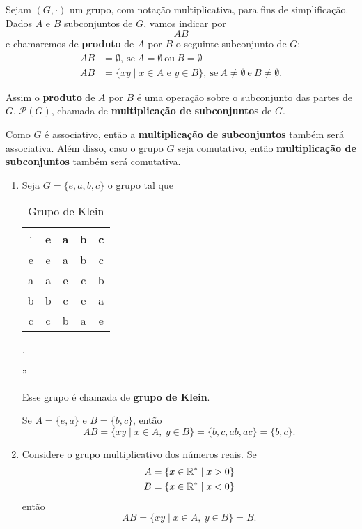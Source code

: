 Sejam $(G, \cdot)$ um grupo, com notação multiplicativa, para fins de simplificação. Dados $A$ e $B$ subconjuntos de $G$, vamos indicar por
\[
    AB
\]
e chamaremos de \textbf{produto} de $A$ por $B$ o seguinte subconjunto de $G$:
\begin{align*}
    AB &= \emptyset,\ \mbox{se}\ A = \emptyset\ \mbox{ou}\ B = \emptyset\\
    AB &= \{xy \mid x \in A \mbox{ e } y \in B\},\ \mbox{se}\ A \ne \emptyset\ \mbox{e}\ B \ne \emptyset.
\end{align*}

Assim o \textbf{produto} de $A$ por $B$ é uma operação sobre o subconjunto das partes de $G$, $\mathcal{P}(G)$, chamada de \textbf{multiplicação de subconjuntos} de $G$.

Como $G$ é associativo, então a \textbf{multiplicação de subconjuntos} também será associativa. Além disso, caso o grupo $G$ seja comutativo, então \textbf{multiplicação de subconjuntos} também será comutativa.

\begin{exemplos}
    \begin{enumerate}[label={\arabic*})]
        \item Seja $G = \{e, a, b, c\}$ o grupo tal que
        \begin{center}
            \begin{table}[htp]
                \centering
                \caption{Grupo de Klein}
                \begin{tabular}{|c|c|c|c|c|}
                    \hline
                    $\cdot$ & e & a & b & c\\
                    \hline
                    e & e & a & b & c\\
                    \hline
                    a & a & e & c & b\\
                    \hline
                    b & b & c & e & a\\
                    \hline
                    c & c & b & a & e\\
                    \hline
                \end{tabular}.
            \end{table}    ''
        \end{center}

        Esse grupo é chamada de \textbf{grupo de Klein}.

        Se $A = \{e, a\}$ e $B = \{b, c\}$, então
        \[
            AB = \{xy \mid x \in A,\ y \in B\} = \{b, c, ab, ac\} = \{b, c\}.
        \]

        \item Considere o grupo multiplicativo dos números reais. Se
        \begin{align*}
            A &= \{x \in \mathbb{R}^* \mid x > 0\}\\
            B &= \{x \in \mathbb{R}^* \mid x < 0\}
        \end{align*}
        então
        \[
            AB = \{xy \mid x \in A,\ y \in B\} = B.
        \]
    \end{enumerate}
\end{exemplos}

